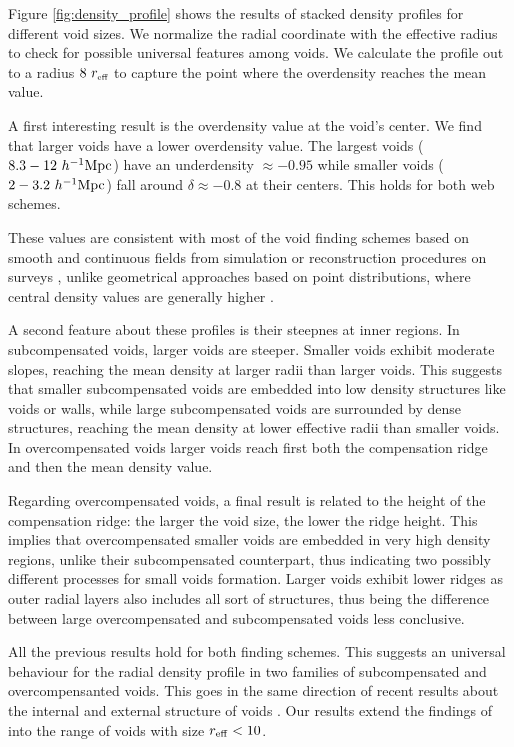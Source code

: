 \documentclass[a4,useAMS,usenatbib,usegraphicx]{mn2e}
\newcommand{\hMpc}{{\ifmmode{h^{-1}{\rm Mpc}}\else{$h^{-1}$Mpc}\fi}}
\newcommand{\reff}{{\ifmmode{r_{\mbox{\tiny eff}}}\else{$r_{\mbox{\tiny eff}}$}\fi}}
\begin{document}
Figure \ref{fig:density_profile} shows the results of stacked density
profiles for different void sizes.  
We normalize the radial coordinate with the effective radius to check
for possible universal features among voids. 
We calculate the profile out to a radius $8\ \reff$  to capture the
point where the overdensity reaches the mean value.


A first interesting result is the overdensity value at the void's
center.
We find that larger voids have a lower overdensity value.
The largest voids ($8.3-12\ \hMpc$) have an underdensity
$\approx-0.95$ while smaller voids  ($2-3.2\ \hMpc$) fall around $\delta\approx 
-0.8$ at their centers.
This holds for both web schemes. 

These values are consistent with most of the void finding schemes
based on smooth and continuous fields from simulation or
reconstruction procedures on surveys \citep{Plionis02, Colberg05,
  Shandarin06,  Platen07, Neyrinck08, MunozCuartas11, Ceccarelli13,
  Paz13, Neyrinck13, Ricciardelli2013}, unlike geometrical approaches based 
on point distributions, where central density values are generally higher
\citep{Colberg08}. 


A second feature about these profiles is their steepnes at inner
regions.  
In subcompensated voids, larger voids are steeper.
Smaller voids exhibit moderate slopes, reaching the mean density at
larger radii than larger voids.
This suggests that smaller subcompensated voids are embedded into low
density structures like voids or walls, while large subcompensated
voids are surrounded  by dense structures, reaching the mean density
at lower effective radii than smaller voids.
In overcompensated voids larger voids reach first  both the
compensation ridge and then the mean density value.  


Regarding overcompensated voids, a final result is related to the height 
of the compensation ridge: the larger the void size, the lower the ridge
height. This implies that overcompensated smaller voids are embedded in 
very high density regions, unlike their subcompensated counterpart, thus 
indicating two possibly different processes for small voids formation. 
Larger voids exhibit lower ridges as outer radial layers also includes all
sort of structures, thus being the difference between large overcompensated
and subcompensated voids less conclusive.

All the previous results hold for both finding schemes.
This suggests an universal behaviour for the radial density profile in
two families of subcompensated and overcompensanted voids. 
This goes in the same direction of recent results about the internal
\citep{Colberg05,  Ricciardelli2013} and external structure of voids
\citep{Lavaux12, Ceccarelli13, Paz13, Hamaus14}. 
Our results extend the findings of \cite{Hamaus14} into the range of
voids with size $r_{\rm eff}<10$\hMpc. 
\end{document}
